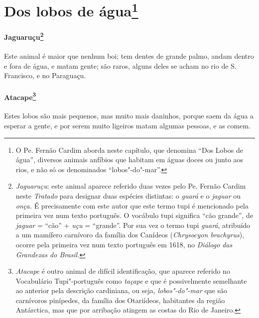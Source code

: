 \section[Dos lobos de água]{Dos lobos de água\protect\footnote[*]{ \MakeUppercase{O P}e. \MakeUppercase{F}ernão \MakeUppercase{C}ardim aborda
neste capítulo, que denomina ``\MakeUppercase{D}os \MakeUppercase{L}obos de água'', diversos animais
anfíbios que habitam em águas doces ou junto aos rios, e não só os
denominados ``lobos"-do"-mar''.}} 
\paragraph{Jaguaruçu\footnote{ \textit{Jaguaruçu}: este animal
aparece referido duas vezes pelo Pe. Fernão Cardim neste
\textit{Tratado} para designar duas espécies distintas: o \textit{guará}
e o \textit{jaguar} ou \textit{onça.} É precisamente com este autor
que este termo tupi é mencionado pela primeira vez num texto português.
O vocábulo tupi significa ``cão grande'', de \textit{jaguar} = ``cão'' +
\textit{uçu} = ``grande''. Por sua vez o termo tupi \textit{guará}, 
atribuído a um mamífero carnívoro da família dos Canídeos
(\textit{Chrysocyon brachyrus}), ocorre pela primeira vez num texto
português em 1618, no \textit{Diálogo das Grandezas do Brasil.}}}
 Este animal é maior que nenhum boi; tem dentes de grande
palmo, andam dentro e fora de água, e matam gente; são raros, alguns
deles se acham no rio de S. Francisco, e no Paraguaçu.

\paragraph{Atacape\footnote{ \textit{Atacape} é outro animal de
difícil identificação, que aparece referido no Vocabulário
Tupi"-português como \textit{taçape} e que é possivelmente semelhante ao
anterior pela descrição cardiniana, ou seja, \textit{lobos"-do"-mar} que
são carnívoros pinípedes, da família dos Otariídeos, habitantes da
região Antárctica, mas que por arribação atingem as costas do Rio de
Janeiro.}} Estes lobos são mais pequenos, mas muito mais
daninhos, porque saem da água a esperar a gente, e por serem muito
ligeiros matam algumas pessoas, e as comem.

